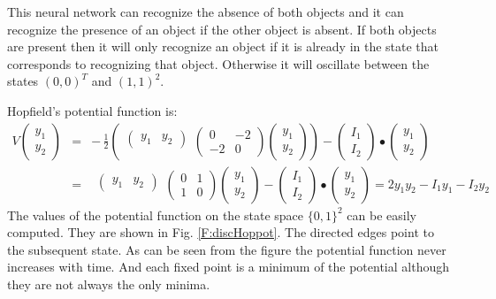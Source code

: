    This neural network can recognize the absence of both objects and it can
recognize the presence of an object if the other object is absent.  If both
objects are present then it will only recognize an object if it is already in 
the state that corresponds to recognizing that object.  Otherwise it will
oscillate between the states $(0,0)^T$ and $(1,1)^2$.

  Hopfield's potential function is:
\begin{eqnarray*}
V
\begin{pmatrix}
y_1 \\  y_2
\end{pmatrix}
 &=& -\,\displaystyle{\frac{1}{2}} \left(
  \begin{matrix}\begin{pmatrix}y_1 & y_2\end{pmatrix}\\\mbox{}\end{matrix}
  \begin{pmatrix} 0 & -2 \\ -2 & 0 \end{pmatrix} 
  \begin{pmatrix} y_1 \\ y_2 \end{pmatrix} \right) 
-
\begin{pmatrix}
I_1 \\ I_2 
\end{pmatrix}
\bullet
\begin{pmatrix}
y_1 \\ y_2 
\end{pmatrix} \\
~ &=& 
  \begin{matrix}\begin{pmatrix}y_1 & y_2\end{pmatrix}\\\mbox{}\end{matrix}
  \begin{pmatrix} 0 & 1 \\ 1 & 0 \end{pmatrix} 
  \begin{pmatrix} y_1 \\ y_2 \end{pmatrix} 
-
\begin{pmatrix}
I_1 \\ I_2 
\end{pmatrix}
\bullet
\begin{pmatrix}
y_1 \\ y_2 
\end{pmatrix} = 2 y_1 y_2 - I_1 y_1 - I_2 y_2
\end{eqnarray*}
The values of the potential function on the state space $\{0,1\}^2$ can be
easily computed.  They are shown in Fig. \ref{F:discHoppot}.  The directed 
edges point to the subsequent state.  As can be seen from the figure the 
potential function never increases with time.  And each fixed point is a 
minimum of the potential although they are not always the only minima.

